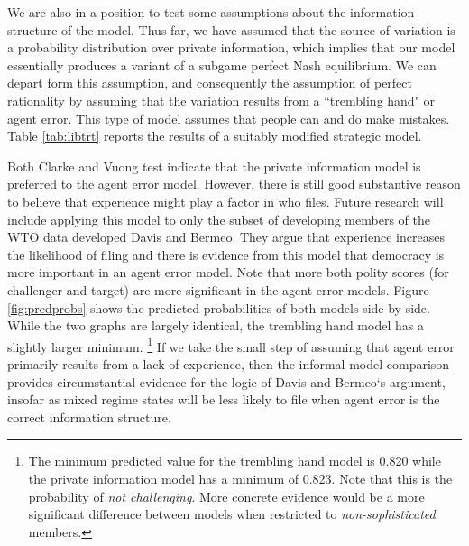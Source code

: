 \documentclass[]{article}
\begin{document}
We are also in a position to test some assumptions about the information structure of the model. Thus far, we have assumed that the source of variation is a probability distribution over private information, which implies that our model essentially produces a variant of a subgame perfect Nash equilibrium. We can depart form this assumption, and consequently the assumption of perfect rationality by assuming that the variation results from a ``trembling hand" or agent error. This type of model assumes that people can and do make mistakes. Table \ref{tab:libtrt} reports the results of a suitably modified strategic model. 

Both Clarke and Vuong test indicate that the private information model is preferred to the agent error model. However, there is still good substantive reason to believe that experience might play a factor in who files. Future research will include applying this model to only the subset of developing members of the WTO data developed Davis and Bermeo.  They argue that experience increases the likelihood of filing and there is  evidence from this model that  democracy is more important in an agent error model. Note that more both polity scores (for challenger and target) are more significant in the agent error models. Figure \ref{fig:predprobs} shows the predicted probabilities of both models side by side. While the two graphs are largely identical, the trembling hand model has a slightly larger minimum. \footnote{The minimum predicted value for the trembling hand model is 0.820 while the private information model has a minimum of 0.823. Note that this is the probability of \textit{not challenging}. More concrete evidence would be a more significant difference between models when restricted to \textit{non-sophisticated} members.}   If we take the small step of assuming that agent error primarily results from a lack of experience,  then the informal model comparison provides  circumstantial evidence for the logic of Davis and Bermeo`s argument, insofar as mixed regime states will be less likely to file when agent error is the correct information structure.
\end{document}
